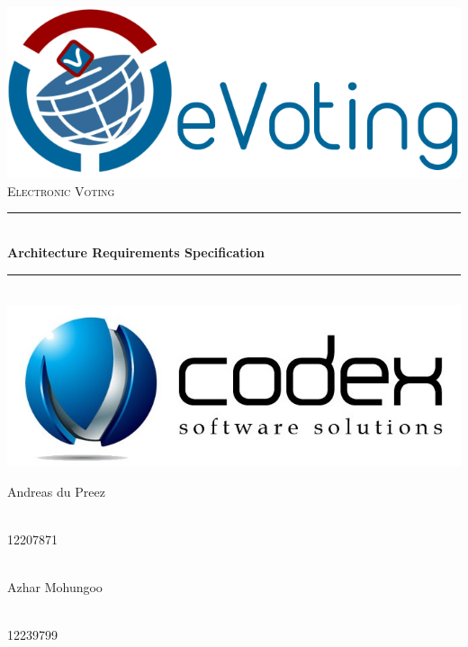 \begin{titlepage}
	
	\begin{center}
		\includegraphics[width=0.7\linewidth]{../Images/eVoting_Logo.png}\\[2cm]    
		\textsc{\LARGE Electronic Voting}\\[0.5cm]
		\rule{\linewidth}{0.5mm} \\[1cm]
		{ \huge \bfseries Architecture Requirements Specification}\\[0.5cm]
		\rule{\linewidth}{0.5mm} \\[1cm]
		
		\includegraphics[width=0.5\linewidth]{../Images/TeamCodexLogo.jpg}\\[0.5cm]    	
		
		
		\begin{minipage}{0.4\textwidth}
			\begin{flushleft} \large
				Andreas {du Preez}
			\end{flushleft}
		\end{minipage}
		\begin{minipage}{0.4\textwidth}
			\begin{flushright} \large
				\emph{} \\
				12207871 
			\end{flushright}
		\end{minipage}
		
		
		\begin{minipage}{0.4\textwidth}
			\begin{flushleft} \large
				\emph{} \\
				Azhar {Mohungoo }
			\end{flushleft}
		\end{minipage}
		\begin{minipage}{0.4\textwidth}
			\begin{flushright} \large
				\emph{} \\
				12239799
			\end{flushright}
		\end{minipage}
		

\end{center}
\end{titlepage}
